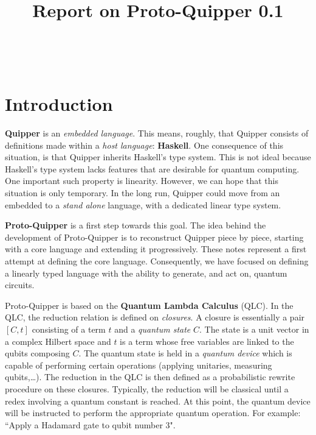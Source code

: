 \documentclass{article}
\title{\textbf{Report on Proto-Quipper 0.1}}
\date{}
\author{}
\begin{document}
 

\maketitle

\noindent\hrulefill
\tableofcontents

\

\noindent\hrulefill


\section{Introduction}

\textbf{Quipper} is an \emph{embedded language}. This means, roughly, that Quipper 
consists of definitions made within a \emph{host language}: \textbf{Haskell}. 
One consequence of this situation, is that Quipper inherits Haskell's type system. 
This is not ideal because Haskell's type system lacks features that are 
desirable for quantum computing. One important such property is linearity. 
However, we can hope that this situation is only temporary. In the long run, 
Quipper could move from an embedded to a \emph{stand alone} language, with a 
dedicated linear type system.

\textbf{Proto-Quipper} is a first step towards this goal. The idea behind the 
development of Proto-Quipper is to reconstruct Quipper piece by piece, starting 
with a core language and extending it progressively. These notes represent a first 
attempt at defining the core language. Consequently, we have focused on defining 
a linearly typed language with the ability to generate, and act on, quantum circuits.  

Proto-Quipper is based on the \textbf{Quantum Lambda Calculus} (QLC). In the QLC, 
the reduction relation is defined on \emph{closures}. A closure is essentially a 
pair $[C,t]$ consisting of a term $t$ and a \emph{quantum state} $C$. The state is 
a unit vector in a complex Hilbert space and $t$ is a term whose free variables are 
linked to the qubits composing $C$. The quantum state is held in a 
\emph{quantum device} which is capable of performing certain operations (applying 
unitaries, measuring qubits,\ldots). The reduction in the QLC is then defined as a 
probabilistic rewrite procedure on these closures. Typically, the reduction will be 
classical until a redex involving a quantum constant is reached. At this point, 
the quantum device will be instructed to perform the appropriate quantum operation. 
For example: ``Apply a Hadamard gate to qubit number 3". 
\end{document}
